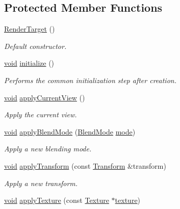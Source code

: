 \subsection*{Protected Member Functions}
\begin{DoxyCompactItemize}
\item 
\hyperlink{classsf_1_1_render_target_a2997c96cbd93cb8ce0aba2ddae35b86f}{Render\-Target} ()
\begin{DoxyCompactList}\small\item\em Default constructor. \end{DoxyCompactList}\item 
\hyperlink{glutf90_8h_ac778d6f63f1aaf8ebda0ce6ac821b56e}{void} \hyperlink{classsf_1_1_render_target_af530274b34159d644e509b4b4dc43eb7}{initialize} ()
\begin{DoxyCompactList}\small\item\em Performs the common initialization step after creation. \end{DoxyCompactList}\item 
\hyperlink{glutf90_8h_ac778d6f63f1aaf8ebda0ce6ac821b56e}{void} \hyperlink{classsf_1_1_render_target_a3ed439c5445e9c7d7ff786ff37005efa}{apply\-Current\-View} ()
\begin{DoxyCompactList}\small\item\em Apply the current view. \end{DoxyCompactList}\item 
\hyperlink{glutf90_8h_ac778d6f63f1aaf8ebda0ce6ac821b56e}{void} \hyperlink{classsf_1_1_render_target_aefd4b1cc8e264598b94bd70aaac5bc99}{apply\-Blend\-Mode} (\hyperlink{group__graphics_ga80c52fe2f7050d7f7573b7ed3c995388}{Blend\-Mode} \hyperlink{gl3_8h_a1e71d9c196e4683cc06c4b54d53f7ef5}{mode})
\begin{DoxyCompactList}\small\item\em Apply a new blending mode. \end{DoxyCompactList}\item 
\hyperlink{glutf90_8h_ac778d6f63f1aaf8ebda0ce6ac821b56e}{void} \hyperlink{classsf_1_1_render_target_a0b23bd7c287d0fc12b0521b649a0a0e0}{apply\-Transform} (const \hyperlink{classsf_1_1_transform}{Transform} \&transform)
\begin{DoxyCompactList}\small\item\em Apply a new transform. \end{DoxyCompactList}\item 
\hyperlink{glutf90_8h_ac778d6f63f1aaf8ebda0ce6ac821b56e}{void} \hyperlink{classsf_1_1_render_target_afb8a49305171aad158a27e0dfbb03709}{apply\-Texture} (const \hyperlink{classsf_1_1_texture}{Texture} $\ast$\hyperlink{gl3_8h_ab21590c4736d1459a5a0674a42b5a655}{texture})

\end{DoxyCompactItemize}
